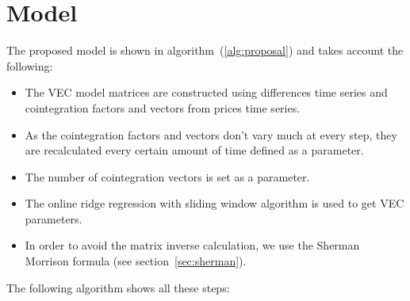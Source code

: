 \section{Model} \label{sec:proposal}

The proposed model is shown in algorithm~(\ref{alg:proposal}) and
takes account the following: 

\begin{itemize}
\item The VEC model matrices are constructed using differences time series
and cointegration factors and vectors from prices time series.
\item As the cointegration factors and vectors don't vary much at every step, they are recalculated every certain amount of time defined as a parameter.
\item The number of cointegration vectors is set as a parameter.
\item The online ridge regression with sliding window algorithm is used to get VEC parameters.
\item In order to avoid the matrix inverse calculation, we use the Sherman
Morrison formula (see section~\ref{sec:sherman}).
\end{itemize}

The following algorithm shows all these steps:

